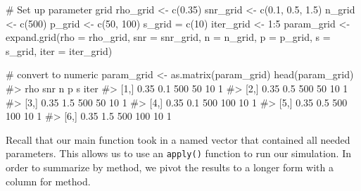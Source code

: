 \documentclass[
  letterpaper,
]{latex/krantz}
\makeatletter
\newenvironment{Shaded}{\begin{snugshade}}{\end{snugshade}}
\newcommand{\AttributeTok}[1]{\textcolor[rgb]{0.40,0.45,0.13}{#1}}
\newcommand{\CommentTok}[1]{\textcolor[rgb]{0.37,0.37,0.37}{#1}}
\newcommand{\DecValTok}[1]{\textcolor[rgb]{0.68,0.00,0.00}{#1}}
\newcommand{\FloatTok}[1]{\textcolor[rgb]{0.68,0.00,0.00}{#1}}
\newcommand{\FunctionTok}[1]{\textcolor[rgb]{0.28,0.35,0.67}{#1}}
\newcommand{\NormalTok}[1]{\textcolor[rgb]{0.00,0.23,0.31}{#1}}
\newcommand{\OtherTok}[1]{\textcolor[rgb]{0.00,0.23,0.31}{#1}}
\newcommand{\SpecialCharTok}[1]{\textcolor[rgb]{0.37,0.37,0.37}{#1}}
\newenvironment{kframe}{%
\medskip{}
\setlength{\fboxsep}{.8em}
 \def\at@end@of@kframe{}%
 \ifinner\ifhmode%
  \def\at@end@of@kframe{\end{minipage}}%
  \begin{minipage}{\columnwidth}%
 \fi\fi%
 \def\FrameCommand##1{\hskip\@totalleftmargin \hskip-\fboxsep
 \colorbox{shadecolor}{##1}\hskip-\fboxsep
     \hskip-\linewidth \hskip-\@totalleftmargin \hskip\columnwidth}%
 \MakeFramed {\advance\hsize-\width
   \@totalleftmargin\z@ \linewidth\hsize
   \@setminipage}}%
 {\par\unskip\endMakeFramed%
 \at@end@of@kframe}
\renewenvironment{Shaded}{\begin{kframe}}{\end{kframe}}
\makeatother
\begin{document}
\begin{Shaded}
\begin{Highlighting}[]
\CommentTok{\# Set up parameter grid}
\NormalTok{rho\_grid }\OtherTok{\textless{}{-}} \FunctionTok{c}\NormalTok{(}\FloatTok{0.35}\NormalTok{)}
\NormalTok{snr\_grid }\OtherTok{\textless{}{-}} \FunctionTok{c}\NormalTok{(}\FloatTok{0.1}\NormalTok{, }\FloatTok{0.5}\NormalTok{, }\FloatTok{1.5}\NormalTok{)}
\NormalTok{n\_grid }\OtherTok{\textless{}{-}} \FunctionTok{c}\NormalTok{(}\DecValTok{500}\NormalTok{)}
\NormalTok{p\_grid }\OtherTok{\textless{}{-}} \FunctionTok{c}\NormalTok{(}\DecValTok{50}\NormalTok{, }\DecValTok{100}\NormalTok{)}
\NormalTok{s\_grid }\OtherTok{=} \FunctionTok{c}\NormalTok{(}\DecValTok{10}\NormalTok{)}
\NormalTok{iter\_grid }\OtherTok{\textless{}{-}} \DecValTok{1}\SpecialCharTok{:}\DecValTok{5}
\NormalTok{param\_grid }\OtherTok{\textless{}{-}} \FunctionTok{expand.grid}\NormalTok{(}\AttributeTok{rho =}\NormalTok{ rho\_grid, }\AttributeTok{snr =}\NormalTok{ snr\_grid, }\AttributeTok{n =}\NormalTok{ n\_grid,}
                          \AttributeTok{p =}\NormalTok{ p\_grid, }\AttributeTok{s =}\NormalTok{ s\_grid, }\AttributeTok{iter =}\NormalTok{ iter\_grid)}

\CommentTok{\# convert to numeric}
\NormalTok{param\_grid }\OtherTok{\textless{}{-}} \FunctionTok{as.matrix}\NormalTok{(param\_grid)}
\FunctionTok{head}\NormalTok{(param\_grid)}
\CommentTok{\#\textgreater{}       rho snr   n   p  s iter}
\CommentTok{\#\textgreater{} [1,] 0.35 0.1 500  50 10    1}
\CommentTok{\#\textgreater{} [2,] 0.35 0.5 500  50 10    1}
\CommentTok{\#\textgreater{} [3,] 0.35 1.5 500  50 10    1}
\CommentTok{\#\textgreater{} [4,] 0.35 0.1 500 100 10    1}
\CommentTok{\#\textgreater{} [5,] 0.35 0.5 500 100 10    1}
\CommentTok{\#\textgreater{} [6,] 0.35 1.5 500 100 10    1}
\end{Highlighting}
\end{Shaded}

Recall that our main function took in a named vector that contained all
needed parameters. This allows us to use an
\texttt{apply()} function to
run our simulation. In order to summarize by method, we pivot the
results to a longer form with a column for method.
\end{document}
